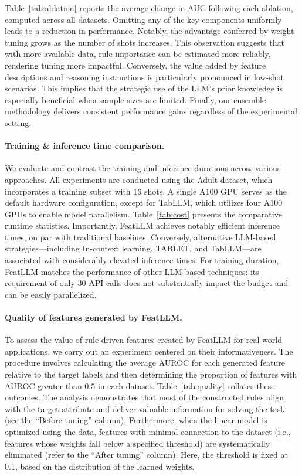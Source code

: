 Table~\ref{tab:ablation} reports the average change in AUC following each ablation, computed across all datasets. Omitting any of the key components uniformly leads to a reduction in performance. Notably, the advantage conferred by weight tuning grows as the number of shots increases. This observation suggests that with more available data, rule importance can be estimated more reliably, rendering tuning more impactful. Conversely, the value added by feature descriptions and reasoning instructions is particularly pronounced in low-shot scenarios. This implies that the strategic use of the LLM's prior knowledge is especially beneficial when sample sizes are limited. Finally, our ensemble methodology delivers consistent performance gains regardless of the experimental setting.

\vspace*{-0.12in}
\paragraph{Training \& inference time comparison.} We evaluate and contrast the training and inference durations across various approaches. All experiments are conducted using the Adult dataset, which incorporates a training subset with 16 shots. A single A100 GPU serves as the default hardware configuration, except for TabLLM, which utilizes four A100 GPUs to enable model parallelism. Table~\ref{tab:cost} presents the comparative runtime statistics. Importantly, \textsf{FeatLLM} achieves notably efficient inference times, on par with traditional baselines. Conversely, alternative LLM-based strategies—including In-context learning, TABLET, and TabLLM—are associated with considerably elevated inference times. For training duration, \textsf{FeatLLM} matches the performance of other LLM-based techniques: its requirement of only 30 API calls does not substantially impact the budget and can be easily parallelized.

\vspace*{-0.12in}
\paragraph{Quality of features generated by \textsf{FeatLLM}.}
To assess the value of rule-driven features created by \textsf{FeatLLM} for real-world applications, we carry out an experiment centered on their informativeness. The procedure involves calculating the average AUROC for each generated feature relative to the target labels and then determining the proportion of features with AUROC greater than 0.5 in each dataset. Table~\ref{tab:quality} collates these outcomes. The analysis demonstrates that most of the constructed rules align with the target attribute and deliver valuable information for solving the task (see the ``Before tuning'' column). Furthermore, when the linear model is optimized using the data, features with minimal connection to the dataset (i.e., features whose weights fall below a specified threshold) are systematically eliminated (refer to the ``After tuning'' column). Here, the threshold is fixed at 0.1, based on the distribution of the learned weights.


